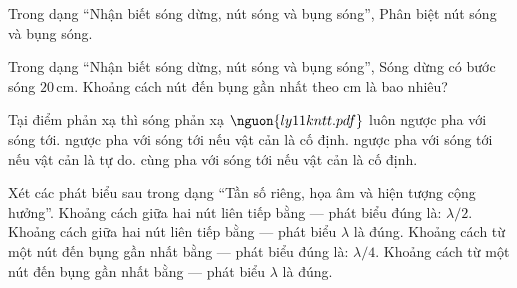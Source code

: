 \begin{ex}
Trong dạng “Nhận biết sóng dừng, nút sóng và bụng sóng”, Phân biệt nút sóng và bụng sóng.
\choiceTF

\end{ex}

\begin{ex}
Trong dạng “Nhận biết sóng dừng, nút sóng và bụng sóng”, Sóng dừng có bước sóng $20\,\text{cm}$. Khoảng cách nút đến bụng gần nhất theo cm là bao nhiêu?
\end{ex}

\begin{ex}
Tại điểm phản xạ thì sóng phản xạ $\nguon{ly11 kntt.pdf}$
\choice
{luôn ngược pha với sóng tới.}
{\True ngược pha với sóng tới nếu vật cản là cố định.}
{ngược pha với sóng tới nếu vật cản là tự do.}
{cùng pha với sóng tới nếu vật cản là cố định.}
\end{ex}

\begin{ex}
Xét các phát biểu sau trong dạng “Tần số riêng, họa âm và hiện tượng cộng hưởng”.
\choiceTF
{\True Khoảng cách giữa hai nút liên tiếp bằng — phát biểu đúng là: $\lambda/2$.}
{Khoảng cách giữa hai nút liên tiếp bằng — phát biểu $\lambda$ là đúng.}
{\True Khoảng cách từ một nút đến bụng gần nhất bằng — phát biểu đúng là: $\lambda/4$.}
{Khoảng cách từ một nút đến bụng gần nhất bằng — phát biểu $\lambda$ là đúng.}
\end{ex}

